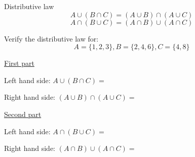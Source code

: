 \documentclass{./../../latex/handout}
\begin{document}
\thispagestyle{plain}
\newcommand{\mytitle}{Sets}
\myheader{\mytitle}


\vspace{0.5em}
Distributive law
$$ A \cup (B \cap C) = (A \cup B) \cap (A \cup C) $$
$$ A \cap (B \cup C) = (A \cap B) \cup (A \cap C) $$

\vspace{1em}

Verify the distributive law for:
$$ A = \{1,2,3\}, B = \{2,4,6\}, C=\{4,8\} $$

\underline{First part}

\vspace{0.5em}
Left hand side: $ A \cup (B \cap C) = $

\vspace{2.4cm}

Right hand side: $ (A \cup B) \cap (A \cup C) = $

\vspace{2.4cm}

\underline{Second part}

\vspace{0.5em}
Left hand side: $ A \cap (B \cup C) = $

\vspace{2.4cm}

Right hand side: $ (A \cap B) \cup (A \cap C) = $

\vspace{2.4cm}
\end{document}
